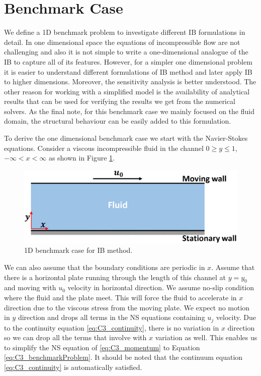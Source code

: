 \section{Benchmark Case}\label{sec:C3_benchmark_case}
We define a 1D benchmark problem to investigate different IB formulations in detail. In one dimensional space the equations of incompressible flow are not challenging and also it is not simple to write a one-dimensional analogue of the IB to capture all of its features. However, for a simpler one dimensional problem it is easier to understand different formulations of IB method and later apply IB to higher dimensions. Moreover, the sensitivity analysis is better understood. The other reason for working with a simplified model is the availability of analytical results that can be used for verifying the results we get from the numerical solvers. As the final note, for this benchmark case we mainly focused on the fluid domain, the structural behaviour can be easily added to this formulation.

To derive the one dimensional benchmark case we start with the Navier-Stokes equations. Consider a viscous incompressible fluid in the channel $0 \geq y \leq 1$, $-\infty < x < \infty$ as shown in Figure \ref{fig:C3_benchmarkCase}.

\begin{figure}[H]
	\centering
	\includegraphics[width=14.00cm]{Chapter_3/figure/C3_infinite_channel.png}
	\caption{1D benchmark case for IB method.}
	\label{fig:C3_benchmarkCase}
\end{figure}

We can also assume that the boundary conditions are periodic in $x$. Assume that there is a horizontal plate running through the length of this channel at $y=y_0$ and moving with $u_0$ velocity in horizontal direction. We assume no-slip condition where the fluid and the plate meet. This will force the fluid to accelerate in $x$ direction due to the viscous stress from the moving plate. We expect no motion in $y$ direction and drops all terms in the NS equations containing $u_j$ velocity. Due to the continuity equation \eqref{eq:C3_continuity}, there is no variation in $x$ direction so we can drop all the terms that involve with $x$ variation as well. This enables us to simplify the NS equation of \eqref{eq:C3_momentum} to Equation \eqref{eq:C3_benchmarkProblem}. It should be noted that the continuum equation \eqref{eq:C3_continuity} is automatically satisfied.

